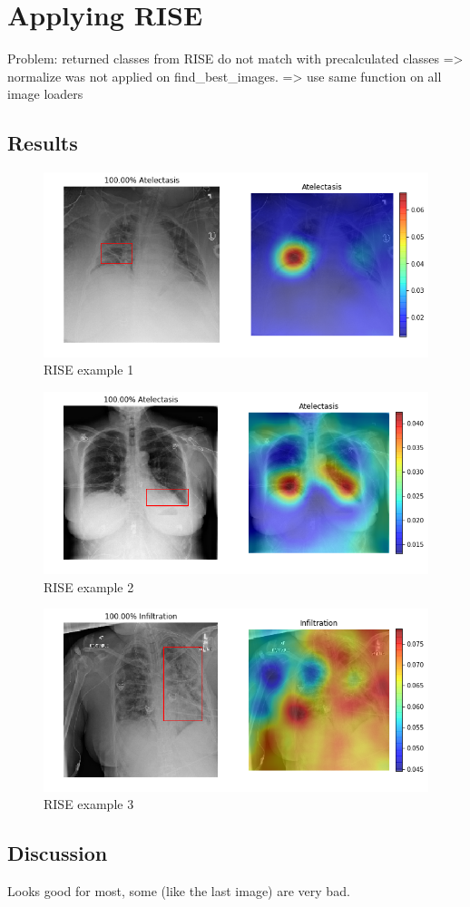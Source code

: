 \section{Applying RISE}
Problem: returned classes from RISE do not match with precalculated classes
=> normalize was not applied on find\_best\_images.
=> use same function on all image loaders


\subsection{Results}
\begin{figure}[H]
\centering
\caption{RISE example 1}
\includegraphics[width=12cm]{chapters/03_classification/images/rise_0.png}
\end{figure}

\begin{figure}[H]
\centering
\caption{RISE example 2}
\includegraphics[width=12cm]{chapters/03_classification/images/rise_2.png}
\end{figure}

\begin{figure}[H]
\centering
\caption{RISE example 3}
\includegraphics[width=12cm]{chapters/03_classification/images/rise_8.png}
\end{figure}

\subsection{Discussion}
Looks good for most, some (like the last image) are very bad.

